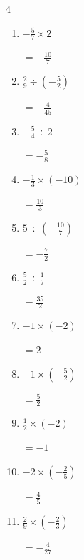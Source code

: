 \newpage
\resetdrill

\begin{multicols}{4}
\begin{enumerate}
  \itemsep=18pt
  \item $\displaystyle -\frac{5}{7}\times{}2$

        $\displaystyle =-\frac{10}{7}$

  \item $\displaystyle \frac{2}{9}\div{}\left(-\frac{5}{2}\right)$

        $\displaystyle =-\frac{4}{45}$

  \item $\displaystyle -\frac{5}{4}\div{}2$

        $\displaystyle =-\frac{5}{8}$

  \item $\displaystyle -\frac{1}{3}\times{}\left(-10\right)$

        $\displaystyle =\frac{10}{3}$

  \item $\displaystyle 5\div{}\left(-\frac{10}{7}\right)$

        $\displaystyle =-\frac{7}{2}$

  \item $\displaystyle \frac{5}{2}\div{}\frac{1}{7}$

        $\displaystyle =\frac{35}{2}$

  \item $\displaystyle -1\times{}\left(-2\right)$

        $\displaystyle =2$

  \item $\displaystyle -1\times{}\left(-\frac{5}{2}\right)$

        $\displaystyle =\frac{5}{2}$

  \item $\displaystyle \frac{1}{2}\times{}\left(-2\right)$

        $\displaystyle =-1$

  \item $\displaystyle -2\times{}\left(-\frac{2}{5}\right)$

        $\displaystyle =\frac{4}{5}$

\columnbreak %

  \item $\displaystyle \frac{2}{9}\times{}\left(-\frac{2}{3}\right)$

        $\displaystyle =-\frac{4}{27}$


\end{enumerate}
\end{multicols}
